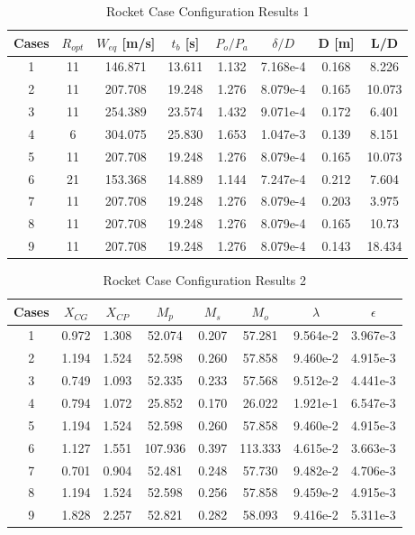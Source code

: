 \documentclass{report}
\begin{document}
\begin{table}[h!]
    \centering
    \caption{Rocket Case Configuration Results 1}
    \begin{tabular}{|c|c|c|c|c|c|c|c|}
        \hline
        \textbf{Cases} & $R_{opt}$ & $W_{eq}$ [m/s] & $t_b$ [s] & $P_o/P_a$ & $\delta/D$ & D [m] & L/D \\
        \hline
        1 & 11 & 146.871 & 13.611 & 1.132 & 7.168e-4 & 0.168 & 8.226 \\
        2 & 11 & 207.708 & 19.248 & 1.276 & 8.079e-4 & 0.165 & 10.073 \\
        3 & 11 & 254.389 & 23.574 & 1.432 & 9.071e-4 & 0.172 & 6.401 \\
        \hline
        4 & 6 & 304.075 & 25.830 & 1.653 & 1.047e-3 & 0.139 & 8.151 \\
        5 & 11 & 207.708 & 19.248 & 1.276 & 8.079e-4 & 0.165 & 10.073 \\
        6 & 21 & 153.368 & 14.889 & 1.144 & 7.247e-4 & 0.212 & 7.604 \\
        \hline
        7 & 11 & 207.708 & 19.248 & 1.276 & 8.079e-4 & 0.203 & 3.975 \\
        8 & 11 & 207.708 & 19.248 & 1.276 & 8.079e-4 & 0.165 & 10.73 \\
        9 & 11 & 207.708 & 19.248 & 1.276 & 8.079e-4 & 0.143 & 18.434 \\
        \hline
    \end{tabular}
    \label{table:caseresult1}
\end{table}

\begin{table}[h!]
    \centering
    \caption{Rocket Case Configuration Results 2}
    \begin{tabular}{|c|c|c|c|c|c|c|c|}
        \hline
        \textbf{Cases} & $X_{CG}$ & $X_{CP}$ & $M_p$ & \textbf{$M_s$} & \textbf{$M_o$} & \textbf{$\lambda$} & \textbf{$\epsilon$} \\
        \hline
        1 & 0.972 & 1.308 & 52.074 & 0.207 & 57.281 & 9.564e-2 & 3.967e-3 \\
        2 & 1.194 & 1.524 & 52.598 & 0.260 & 57.858 & 9.460e-2 & 4.915e-3 \\
        3 & 0.749 & 1.093 & 52.335 & 0.233 & 57.568 & 9.512e-2 & 4.441e-3 \\
        \hline
        4 & 0.794 & 1.072 & 25.852 & 0.170 & 26.022 & 1.921e-1 & 6.547e-3 \\
        5 & 1.194 & 1.524 & 52.598 & 0.260 & 57.858 & 9.460e-2 & 4.915e-3 \\
        6 & 1.127 & 1.551 & 107.936 & 0.397 & 113.333 & 4.615e-2 & 3.663e-3 \\
        \hline
        7 & 0.701 & 0.904 & 52.481 & 0.248 & 57.730 & 9.482e-2 & 4.706e-3 \\
        8 & 1.194 & 1.524 & 52.598 & 0.256 & 57.858 & 9.459e-2 & 4.915e-3 \\
        9 & 1.828 & 2.257 & 52.821 & 0.282 & 58.093 & 9.416e-2 & 5.311e-3 \\
        \hline
    \end{tabular}
    \label{table:caseresult2}
\end{table}
\end{document}
